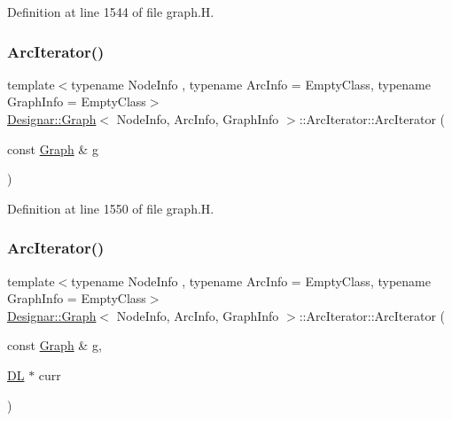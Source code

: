 Definition at line 1544 of file graph.\+H.

\mbox{\label{class_designar_1_1_graph_1_1_arc_iterator_afeb58fdc5c6d4fd2d57c2ce53969203e}} 
\subsubsection{\texorpdfstring{Arc\+Iterator()}{ArcIterator()}\hspace{0.1cm}{\footnotesize\ttfamily [2/5]}}
{\footnotesize\ttfamily template$<$typename Node\+Info , typename Arc\+Info  = Empty\+Class, typename Graph\+Info  = Empty\+Class$>$ \\
\hyperlink{class_designar_1_1_graph}{Designar\+::\+Graph}$<$ Node\+Info, Arc\+Info, Graph\+Info $>$\+::Arc\+Iterator\+::\+Arc\+Iterator (\begin{DoxyParamCaption}\item[{const \hyperlink{class_designar_1_1_graph}{Graph} \&}]{g }\end{DoxyParamCaption})\hspace{0.3cm}{\ttfamily [inline]}}



Definition at line 1550 of file graph.\+H.

\mbox{\label{class_designar_1_1_graph_1_1_arc_iterator_a2a9eb9d16ff5d80a22671dfdbe9ce3a2}} 
\subsubsection{\texorpdfstring{Arc\+Iterator()}{ArcIterator()}\hspace{0.1cm}{\footnotesize\ttfamily [3/5]}}
{\footnotesize\ttfamily template$<$typename Node\+Info , typename Arc\+Info  = Empty\+Class, typename Graph\+Info  = Empty\+Class$>$ \\
\hyperlink{class_designar_1_1_graph}{Designar\+::\+Graph}$<$ Node\+Info, Arc\+Info, Graph\+Info $>$\+::Arc\+Iterator\+::\+Arc\+Iterator (\begin{DoxyParamCaption}\item[{const \hyperlink{class_designar_1_1_graph}{Graph} \&}]{g,  }\item[{\hyperlink{class_designar_1_1_d_l}{DL} $\ast$}]{curr }\end{DoxyParamCaption})\hspace{0.3cm}{\ttfamily [inline]}}



